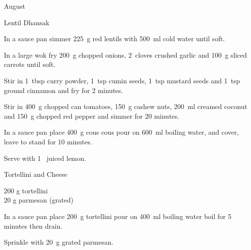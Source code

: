 \begin{menu}{August}
\begin{recipe}{2}{Lentil Dhansak}
	
    \begin{instructions}
    \item 
        In a sauce pan simmer
        225~g  red lentils  
        with 500~ml  cold water
        until soft.      
      \item 
        In a large wok fry
        200~g chopped onions,
        2~cloves crushed garlic
        and
        100~g sliced carrots
        until soft.
      \item 
        Stir in
        1~tbsp  curry powder,
        1~tsp  cumin seeds,
        1~tsp  mustard seeds
        and
        1~tsp  ground cinnamon
        and fry for 2 minutes.
      \item 
        Stir in
        400~g chopped can tomatoes,
        150~g  cashew nuts,
        200~ml  creamed coconut
        and
        150~g chopped red pepper
        and simmer for 20 minutes.
      \item 
      In a
      sauce pan 
      place
      400~g  cous cous
      pour on
      600~ml  boiling water,
      and cover, leave to stand for 10 minutes.
    \item 
        Serve with
        1~ juiced lemon.
      
    \end{instructions}
    \end{recipe}%
  
    \begin{recipe}{1}{Tortellini and Cheese}%
		\begin{ingredients}
		200 g tortellini  \\
	20 g parmesan (grated) \\
	
		\end{ingredients}
	
    \begin{instructions}
    \item 
      In a
      sauce pan
      place
      200~g  tortellini
      pour on
      400~ml  boiling water
      boil for 5 minutes then drain.
    \item 
        Sprinkle with
        20~g grated parmesan.
      
    \end{instructions}
    \end{recipe}%
  
    \clearpage
    \end{menu}
	
